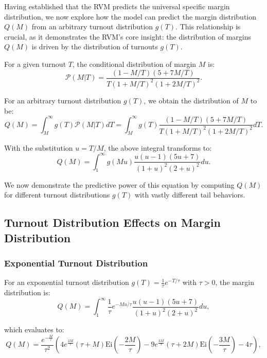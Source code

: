 Having established that the RVM predicts the universal specific margin distribution, we now explore how the model can predict the margin distribution $Q(M)$ from an arbitrary turnout distribution $g(T)$. This relationship is crucial, as it demonstrates the RVM's core insight: the distribution of margins $Q(M)$ is driven by the distribution of turnouts $g(T)$.

For a given turnout $T$, the conditional distribution of margin $M$ is:
\begin{equation}
    \mathcal{P}(M|T) = \frac{(1 - M / T)(5 + 7M /T)}{T(1 + M / T)^2(1 + 2M / T)^2}.
\end{equation}

For an arbitrary turnout distribution $g(T)$, we obtain the distribution of $M$ to be:
\begin{equation}
    Q(M) = \int_{M}^{\infty}g(T)\mathcal{P}(M |T) dT = \int_{M}^{\infty}g(T)\frac{(1 - M / T)(5 + 7M /T)}{T(1 + M / T)^2(1 + 2M / T)^2} dT.
\end{equation}

With the substitution $u = T / M$, the above integral transforms to:
\begin{equation}
    Q(M) = \int_{1}^{\infty}g(Mu)\frac{u(u - 1)(5u + 7)}{(1 + u)^2 (2 + u)^2}du.
    \label{eq:pm}
\end{equation}

We now demonstrate the predictive power of this equation by computing $Q(M)$ for different turnout distributions $g(T)$ with vastly different tail behaviors.

\subsection{Turnout Distribution Effects on Margin Distribution}

\subsubsection{Exponential Turnout Distribution}
For an exponential turnout distribution $g(T) = \frac{1}{\tau}e^{-T / \tau}$ with $\tau > 0$, the margin distribution is:
\begin{equation}
    Q(M) = \int_{1}^{\infty}\frac{1}{\tau}e^{-Mu / \tau} \frac{u(u - 1)(5u + 7)}{(1 + u)^2 (2 + u)^2}du,
\end{equation}

which evaluates to:
\begin{equation}
    Q(M) = \frac{e^{-\frac{M}{\tau}}}{\tau^2} \left(4 e^{\frac{2 M}{\tau}} (\tau+M) \text{Ei}\left(-\frac{2 M}{\tau}\right)-9 e^{\frac{3 M}{\tau}} (\tau+2 M) \text{Ei}\left(-\frac{3 M}{\tau}\right)-4 \tau\right), 
\end{equation}

